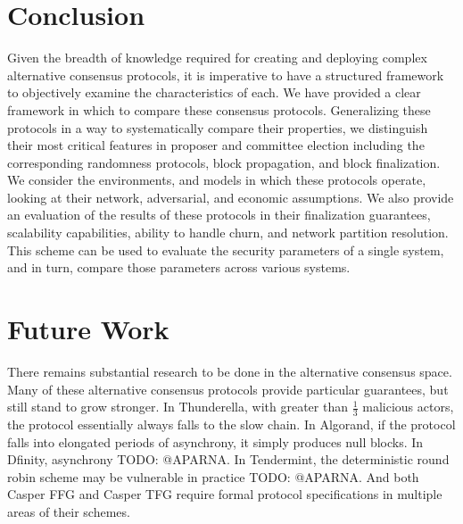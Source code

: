 \documentclass[10pt,journal,compsoc]{IEEEtran}
\begin{document}

\section{Conclusion}

Given the breadth of knowledge required for creating and deploying complex alternative consensus protocols, it is imperative to have a structured framework to objectively examine the characteristics of each. We have provided a clear framework in which to compare these consensus protocols.  Generalizing these protocols in a way to systematically compare their properties, we distinguish their most critical features in proposer and committee election including the corresponding randomness protocols, block propagation, and block finalization. We consider the environments, and models in which these protocols operate, looking at their network, adversarial, and economic assumptions. We also provide an evaluation of the results of these protocols in their finalization guarantees, scalability capabilities, ability to handle churn, and network partition resolution. This scheme can be used to evaluate the security parameters of a single system, and in turn, compare those parameters across various systems. 

\section{Future Work}
There remains substantial research to be done in the alternative consensus space. Many of these alternative consensus protocols provide particular guarantees, but still stand to grow stronger. In Thunderella, with greater than \(\frac{1}{3}\) malicious actors, the protocol essentially always falls to the slow chain. In Algorand, if the protocol falls into elongated periods of asynchrony, it simply produces null blocks. In Dfinity, asynchrony TODO: @APARNA. In Tendermint, the deterministic round robin scheme may be vulnerable in practice TODO: @APARNA. And both Casper FFG and Casper TFG require formal protocol specifications in multiple areas of their schemes. 
\end{document}
